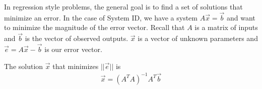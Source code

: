 

In regression style problems, the general goal is to find a set of solutions that minimize an error.
In the case of System ID, we have a system $A\vec{x} = \vec{b}$ and want to minimize the magnitude of the error vector.
Recall that $A$ is a matrix of inputs and $\vec{b}$ is the vector of observed outputs.
$\vec{x}$ is a vector of unknown parameters and $\vec{e} = A\vec{x} - \vec{b}$ is our error vector.

The solution $\vec{x}$ that minimizes $||\vec{e}||$ is
\begin{align*}
\vec{x} = (A^{T}A)^{-1}A^{T}\vec{b}
\end{align*}

